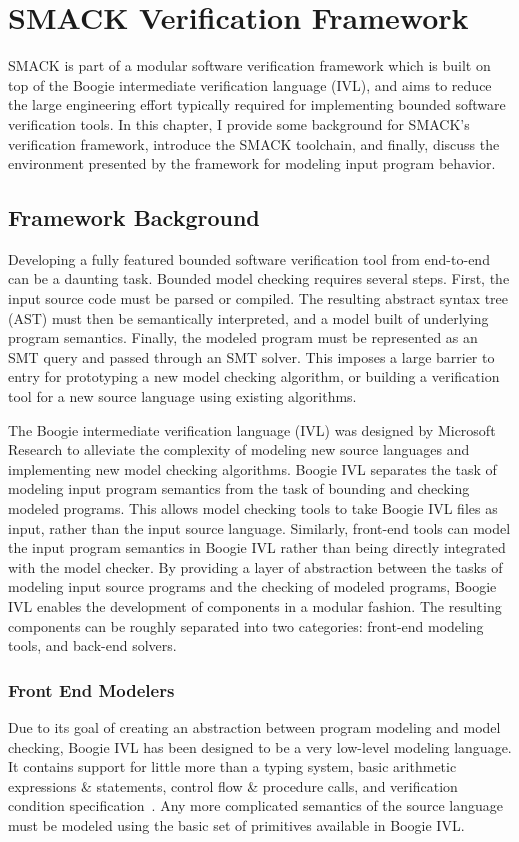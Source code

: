 \chapter{SMACK Verification Framework}\label{ch:smackframework}
SMACK is part of a modular software verification framework which is
built on top of the Boogie intermediate verification language (IVL),
and aims to reduce the large engineering effort typically required for
implementing bounded software verification tools.  In this chapter, I
provide some background for SMACK's verification framework, introduce
the SMACK toolchain, and finally, discuss the environment presented by
the framework for modeling input program behavior. 

\section{Framework Background}
Developing a fully featured bounded software verification tool from
end-to-end can be a daunting task.  Bounded model checking requires
several steps.  First, the input source code must be parsed or
compiled.  The resulting abstract syntax tree (AST) must then be
semantically interpreted, and a model built of underlying program
semantics. Finally, the modeled program must be represented as an SMT
query and passed through an SMT solver.  This imposes a large barrier
to entry for prototyping a new model checking algorithm, or building a
verification tool for a new source language using existing algorithms.

The Boogie intermediate verification language (IVL) was designed by
Microsoft Research to alleviate the complexity of modeling new source
languages and implementing new model checking algorithms.  Boogie IVL
separates the task of modeling input program semantics from the task
of bounding and checking modeled programs.  This allows model checking
tools to take Boogie IVL files as input, rather than the input source
language.  Similarly, front-end tools can model the input program
semantics in Boogie IVL rather than being directly integrated with
the model checker.  By providing a layer of abstraction between the
tasks of modeling input source programs and the checking of modeled
programs, Boogie IVL enables the development of components in a
modular fashion.  The resulting components can be roughly separated
into two categories: front-end modeling tools, and
back-end solvers.

\subsection{Front End Modelers}\label{sec:frontends}
Due to its goal of creating an abstraction between program modeling
and model checking, Boogie IVL has been designed to be a very
low-level modeling language.  It contains support for little more than
a typing system, basic arithmetic expressions \& statements, control
flow \& procedure calls, and verification condition
specification~\cite{boogie}.  Any more complicated semantics of the
source language must be modeled using the basic set of primitives
available in Boogie IVL.

